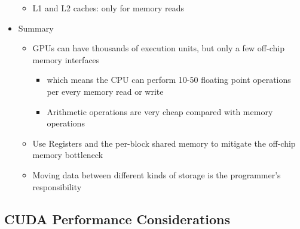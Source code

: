 \documentclass[../main.tex]{subfiles}
\begin{document}
\begin{itemize}
\begin{itemize}
		      \item L1 and L2 caches: only for memory reads
	      \end{itemize}
	\item Summary
	      \begin{itemize}
		      \item GPUs can have thousands of execution units, but only a few off-chip memory interfaces
		            \begin{itemize}
			            \item which means the CPU can perform 10-50 floating point operations per every memory read or write
			            \item Arithmetic operations are very cheap compared with memory operations
		            \end{itemize}
		      \item Use Registers and the per-block shared memory to mitigate the off-chip memory bottleneck
		      \item Moving data between different kinds of storage is the programmer's responsibility
	      \end{itemize}

\end{itemize}

\subsection{CUDA Performance Considerations}
\end{document}
